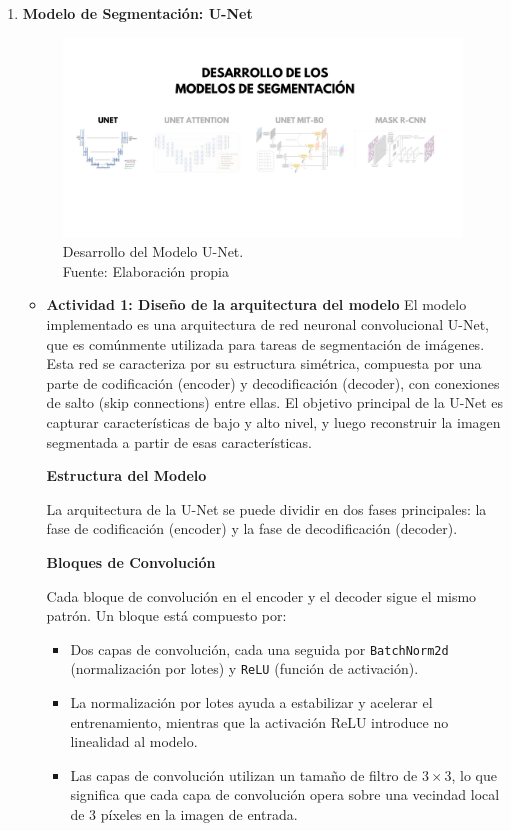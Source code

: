 \begin{enumerate}
  \item \textbf{Modelo de Segmentación: U-Net}
  \begin{figure}[H]
	\begin{center}
		\includegraphics[width=1\textwidth]{4/figures/desunet.png}
		\caption[Desarrollo del Modelo U-Net]{Desarrollo del Modelo U-Net.\\
		Fuente: Elaboración propia}
		\label{4:figdesunet}
	\end{center}
\end{figure}
  \begin{itemize}

  \item\textbf{Actividad 1: Diseño de la arquitectura del modelo}
  El modelo implementado es una arquitectura de red neuronal convolucional U-Net, que es comúnmente utilizada para tareas de segmentación de imágenes. Esta red se caracteriza por su estructura simétrica, compuesta por una parte de codificación (encoder) y decodificación (decoder), con conexiones de salto (skip connections) entre ellas. El objetivo principal de la U-Net es capturar características de bajo y alto nivel, y luego reconstruir la imagen segmentada a partir de esas características.

\textbf{Estructura del Modelo}

La arquitectura de la U-Net se puede dividir en dos fases principales: la fase de codificación (encoder) y la fase de decodificación (decoder).

\textbf{Bloques de Convolución}

Cada bloque de convolución en el encoder y el decoder sigue el mismo patrón. Un bloque está compuesto por:
\begin{itemize}
    \item Dos capas de convolución, cada una seguida por \texttt{BatchNorm2d} (normalización por lotes) y \texttt{ReLU} (función de activación).
    \item La normalización por lotes ayuda a estabilizar y acelerar el entrenamiento, mientras que la activación ReLU introduce no linealidad al modelo.
    \item Las capas de convolución utilizan un tamaño de filtro de $3 \times 3$, lo que significa que cada capa de convolución opera sobre una vecindad local de 3 píxeles en la imagen de entrada.
\end{itemize}


\end{itemize}
\end{enumerate}

